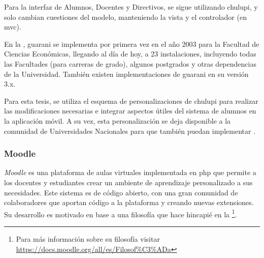 Para la interfaz de Alumnos, Docentes y Directivos, se sigue utilizando \gls{chulupi}, y solo cambian cuestiones del modelo, manteniendo la vista y el controlador (en \gls{mvc}).

En la \unlp, \gls{guarani} se implementa por primera vez en el año 2003 para la Facultad de Ciencias Económicas, llegando al día de hoy, a 23 instalaciones, incluyendo todas las Facultades (para carreras de grado), algunos postgrados y otras dependencias de la Universidad\cite{cespi2017guarani}. También existen implementaciones de \gls{guarani} en su versión 3.x.

Para esta tesis, se utiliza el esquema de personalizaciones de \gls{chulupi} para realizar las modificaciones necesarias e integrar aspectos útiles del sistema de alumnos en la aplicación móvil. A su vez, esta personalización se deja disponible a la comunidad de Universidades Nacionales para que también puedan implementar \nombreApp.

\subsubsection{Moodle}
\label{moodle}

\textit{Moodle} es una plataforma de aulas virtuales implementada en \gls{php} que permite a los docentes y estudiantes crear un ambiente de aprendizaje personalizado a sus necesidades. Este sistema es de código abierto, con una gran comunidad de colaboradores que aportan código a la plataforma y creando nuevas extensiones. Su desarrollo es motivado en base a una filosofía que hace hincapié en la \footnote{Para más información sobre su filosofía visitar \url{https://docs.moodle.org/all/es/Filosof\%C3\%ADa}}.

